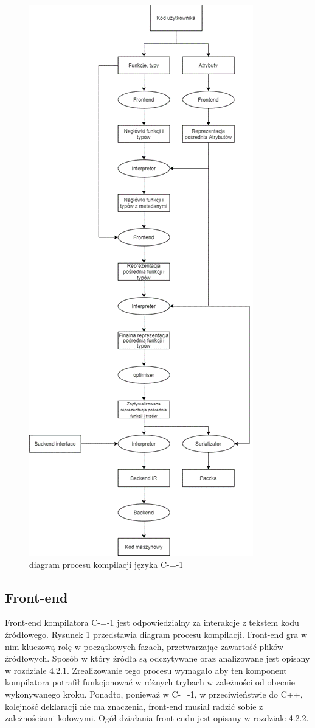 \begin{figure}[]
\includegraphics[scale=0.8]{img/compilation_process.png}
\caption{diagram procesu kompilacji języka C-=-1}
\centering
\end{figure}
\subsection{Front-end}
Front-end kompilatora C-=-1 jest odpowiedzialny za interakcje z tekstem kodu źródłowego. Rysunek 1 przedstawia diagram procesu kompilacji. Front-end gra w nim kluczową rolę w początkowych fazach, przetwarzając zawartość plików źródłowych. Sposób w który źródła są odczytywane oraz analizowane jest opisany w rozdziale 4.2.1.
Zrealizowanie tego procesu wymagało aby ten komponent kompilatora potrafił funkcjonować w różnych trybach w zależności od obecnie wykonywanego kroku. Ponadto, ponieważ w C-=-1, w przeciwieństwie do C++, kolejność deklaracji nie ma znaczenia, front-end musiał radzić sobie z zależnościami kołowymi. Ogół działania front-endu jest opisany w rozdziale 4.2.2.
